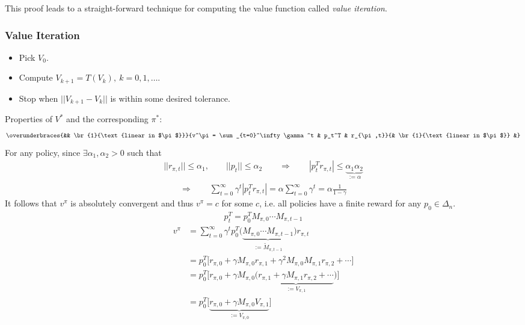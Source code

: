 \documentclass[]{article}
\begin{document}
This proof leads to a straight-forward technique for computing the value function called \emph{value iteration}.  \
\subsubsection*{Value Iteration}
\begin{itemize}
\item Pick $V_0$.  
\item Compute $V_{k+1} = T(V_k), \ k=0,1,\dots$.
\item Stop when $||V_{k+1} - V_k||$ is within some desired tolerance.
\end{itemize}
Properties of $V^*$ and the corresponding $\pi^*$:
\begin{align}
\overunderbraces{&& \br{1}{\text{linear in $\pi$}}}
{v^\pi = \sum_{t=0}^\infty \gamma^t & p_t^T & r_{\pi,t}}
{& \br{1}{\text{linear in $\pi$}} &}
\end{align}
For any policy, since $\exists \alpha_1,\alpha_2 > 0$ such that
\begin{align}
||r_{\pi,t} || \leq \alpha_1, \qquad || p_t || \leq \alpha_2 \qquad \Rightarrow \qquad |p_t^T r_{\pi,t}| \leq \underbrace{\alpha_1\alpha_2}_{:=\alpha}
\end{align}
\begin{align}
\Rightarrow \qquad \sum_{t=0}^\infty \gamma^t |p_t^T r_{\pi,t} | = \alpha \sum_{t=0}^\infty \gamma^t = \alpha \frac{1}{1-\gamma}
\end{align}
It follows that $v^\pi$ is absolutely convergent and thus $v^\pi =c$ for some $c$, i.e. all policies have a finite reward for any $p_0 \in \Delta_n$. 
\begin{align}
p_t^T =  p_0^T M_{\pi,0} \cdots M_{\pi,t-1}
\end{align}
\begin{align}
v^\pi & = \sum_{t=0}^\infty \gamma^t p_0^T \Big( \underbrace{M_{\pi,0} \cdots M_{\pi,t-1}}_{:= \tilde{M}_{\pi,t-1}} \Big) r_{\pi,t} \\
& = p_0^T \Big[ r_{\pi,0} + \gamma M_{\pi,0} r_{\pi,1} + \gamma^2 M_{\pi,0} M_{\pi,1} r_{\pi,2} + \cdots \Big] \\
& = p_0^T \Big[ r_{\pi,0} + \gamma M_{\pi,0} \Big(
\underbrace{r_{\pi,1} + \gamma M_{\pi,1} r_{\pi,2} + \cdots}_{:= V_{\pi,1}} \Big) \Big] \\
& = p_0^T \Big[ \underbrace{ r_{\pi,0} + \gamma  M_{\pi,0} V_{\pi,1}}_{:=V_{\pi,0}}\Big]
\end{align}
\end{document}
